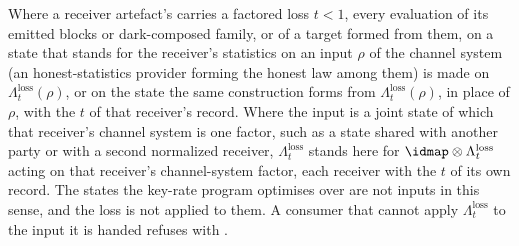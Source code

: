 \begin{requirement}\label{req:loss-before-evaluation}
Where a receiver artefact's  carries a factored loss
$t<1$, every evaluation of its emitted blocks or dark-composed
family, or of a target formed from them, on a state that stands
for the receiver's statistics on an input $\rho$ of the channel system (an
honest-statistics provider forming the honest law among them) is made on
$\Lambda^{\mathrm{loss}}_t(\rho)$, or on the state the same construction forms
from $\Lambda^{\mathrm{loss}}_t(\rho)$, in place of $\rho$, with the $t$ of that
receiver's record. Where the input is a joint state of which that receiver's
channel system is one factor, such as a state shared with another party or
with a second normalized receiver, $\Lambda^{\mathrm{loss}}_t$ stands here for
$\idmap\otimes\Lambda^{\mathrm{loss}}_t$ acting on that receiver's
channel-system factor, each receiver with the $t$ of its own record. The states the
key-rate program optimises over are not inputs in this sense, and the loss
is not applied to them. A consumer that cannot apply $\Lambda^{\mathrm{loss}}_t$ to
the input it is handed refuses with .
\end{requirement}
